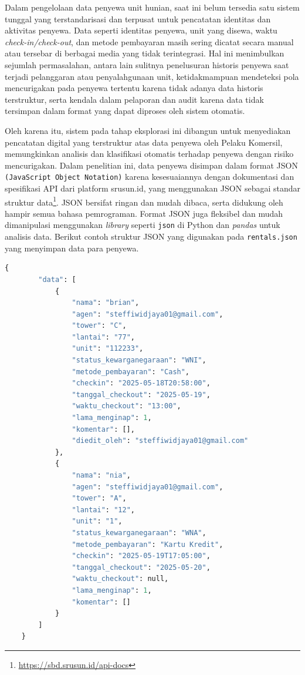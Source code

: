 \begin{enumerate}
    Dalam pengelolaan data penyewa unit hunian, saat ini belum tersedia satu sistem tunggal yang terstandarisasi dan terpusat untuk pencatatan identitas dan aktivitas penyewa. Data seperti identitas penyewa, unit yang disewa, waktu \textit{check-in/check-out}, dan metode pembayaran masih sering dicatat secara manual atau tersebar di berbagai media yang tidak terintegrasi. Hal ini menimbulkan sejumlah permasalahan, antara lain sulitnya penelusuran historis penyewa saat terjadi pelanggaran atau penyalahgunaan unit, ketidakmampuan mendeteksi pola mencurigakan pada penyewa tertentu karena tidak adanya data historis terstruktur, serta kendala dalam pelaporan dan audit karena data tidak tersimpan dalam format yang dapat diproses oleh sistem otomatis.

    Oleh karena itu, sistem \textit{} pada tahap eksplorasi ini dibangun untuk menyediakan pencatatan digital yang terstruktur atas data penyewa oleh Pelaku Komersil, memungkinkan analisis dan klasifikasi otomatis terhadap penyewa dengan risiko mencurigakan. Dalam penelitian ini, data penyewa disimpan dalam format JSON \texttt{(JavaScript Object Notation)} karena kesesuaiannya dengan dokumentasi dan spesifikasi API dari platform srusun.id, yang menggunakan JSON sebagai standar struktur data\footnote{\url{https://sbd.srusun.id/api-docs}}. JSON bersifat ringan dan mudah dibaca, serta didukung oleh hampir semua bahasa pemrograman. Format JSON juga fleksibel dan mudah dimanipulasi menggunakan \textit{library} seperti \texttt{json} di Python dan \textit{pandas} untuk analisis data. Berikut contoh struktur JSON yang digunakan pada \texttt{rentals.json} yang menyimpan data para penyewa.

    \begin{lstlisting}[language=Python, caption={Struktur Data JSON untuk Data Penyewa}, label={lst:json_structure}]
    {
        "data": [
            {
                "nama": "brian",
                "agen": "steffiwidjaya01@gmail.com",
                "tower": "C",
                "lantai": "77",
                "unit": "112233",
                "status_kewarganegaraan": "WNI",
                "metode_pembayaran": "Cash",
                "checkin": "2025-05-18T20:58:00",
                "tanggal_checkout": "2025-05-19",
                "waktu_checkout": "13:00",
                "lama_menginap": 1,
                "komentar": [],
                "diedit_oleh": "steffiwidjaya01@gmail.com"
            },
            {
                "nama": "nia",
                "agen": "steffiwidjaya01@gmail.com",
                "tower": "A",
                "lantai": "12",
                "unit": "1",
                "status_kewarganegaraan": "WNA",
                "metode_pembayaran": "Kartu Kredit",
                "checkin": "2025-05-19T17:05:00",
                "tanggal_checkout": "2025-05-20",
                "waktu_checkout": null,
                "lama_menginap": 1,
                "komentar": []
            }
        ]
    }
    \end{lstlisting}


\end{enumerate}
